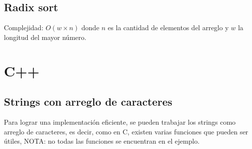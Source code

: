 \documentclass[10pt,letterpaper,twocolumn]{article}
\newcommand{\source}[1]{
	
	\dotfill
}
\begin{document}
	\subsection{Radix sort}
	Complejidad: $O(w \times n)$ donde $n$ es la cantidad de elementos del arreglo y $w$ la longitud del mayor número.\\
	\source{./src/radixSort.cpp}

\section{C++}
	\subsection{Strings con arreglo de caracteres}
	Para lograr una implementación eficiente, se pueden trabajar los strings como arreglo de caracteres, es decir, como en C, existen varias funciones que pueden ser útiles, NOTA: no todas las funciones se encuentran en el ejemplo.
	\source{./src/getsScanfGetline.cpp}
\end{document}

